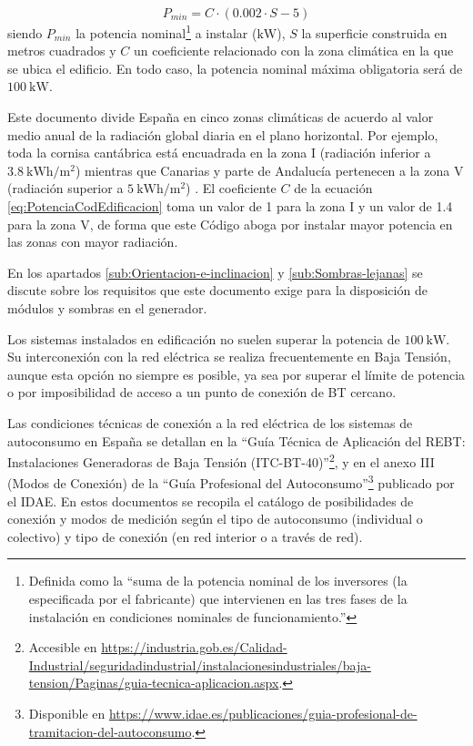 \begin{equation}
P_{min}=C\cdot(0.002\cdot S - 5)
\label{eq:PotenciaCodEdificacion}
\end{equation}
siendo $P_{min}$ la potencia nominal\footnote{Definida como la ``suma
  de la potencia nominal de los inversores (la especificada por el
  fabricante) que intervienen en las tres fases de la instalación en
  condiciones nominales de funcionamiento.''} a instalar
($\si{\kilo\W}$), $S$ la superficie construida en metros cuadrados y
$C$ un coeficiente relacionado con la zona climática en la que se
ubica el edificio.  En todo caso, la potencia nominal máxima
obligatoria será de $\SI{100}{\kilo\watt}$.

Este documento divide España en cinco zonas climáticas de acuerdo al
valor medio anual de la radiación global diaria en el plano
horizontal.  Por ejemplo, toda la cornisa cantábrica está encuadrada
en la zona I (radiación inferior a $\SI{3.8}{\kWh\per\meter\squared}$)
mientras que Canarias y parte de Andalucía pertenecen a la zona V
(radiación superior a $\SI{5}{\kWh\per\meter\squared}$) . El
coeficiente $C$ de la ecuación \ref{eq:PotenciaCodEdificacion} toma un
valor de 1 para la zona I y un valor de 1.4 para la zona V, de forma
que este Código aboga por instalar mayor potencia en las zonas con
mayor radiación.

En los apartados \ref{sub:Orientacion-e-inclinacion} y
\ref{sub:Sombras-lejanas} se discute sobre los requisitos que
este documento exige para la disposición de módulos y sombras en el
generador.

Los sistemas instalados en edificación no suelen superar la potencia
de $\SI{100}{\kilo\watt}$. Su interconexión con la red eléctrica se
realiza frecuentemente en Baja Tensión, aunque esta opción no siempre
es posible, ya sea por superar el límite de potencia o por
imposibilidad de acceso a un punto de conexión de BT cercano.

Las condiciones técnicas de conexión a la red eléctrica de los
sistemas de autoconsumo en España se detallan en la ``Guía Técnica de
Aplicación del REBT: Instalaciones Generadoras de Baja Tensión
(ITC-BT-40)''\footnote{Accesible en
  \url{https://industria.gob.es/Calidad-Industrial/seguridadindustrial/instalacionesindustriales/baja-tension/Paginas/guia-tecnica-aplicacion.aspx}.},
y en el anexo III (Modos de Conexión) de la ``Guía Profesional del
Autoconsumo''\footnote{Disponible en
  \url{https://www.idae.es/publicaciones/guia-profesional-de-tramitacion-del-autoconsumo}.}
publicado por el IDAE. En estos documentos se recopila el catálogo de
posibilidades de conexión y modos de medición según el tipo de
autoconsumo (individual o colectivo) y tipo de conexión (en red
interior o a través de red).


